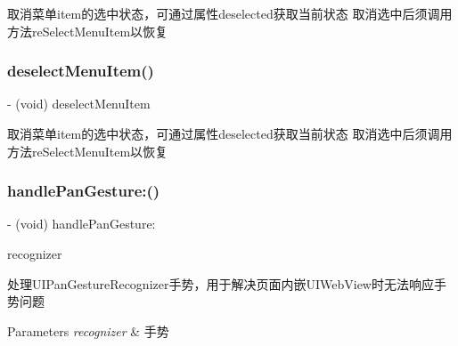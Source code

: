 取消菜单item的选中状态，可通过属性deselected获取当前状态 取消选中后须调用方法re\+Select\+Menu\+Item以恢复 \mbox{\label{interface_v_t_magic_view_a0e92cac6b3957cfc432779b9e9fd953f}} 
\subsubsection{\texorpdfstring{deselect\+Menu\+Item()}{deselectMenuItem()}\hspace{0.1cm}{\footnotesize\ttfamily [3/3]}}
{\footnotesize\ttfamily -\/ (void) deselect\+Menu\+Item \begin{DoxyParamCaption}{ }\end{DoxyParamCaption}}

取消菜单item的选中状态，可通过属性deselected获取当前状态 取消选中后须调用方法re\+Select\+Menu\+Item以恢复 \mbox{\label{interface_v_t_magic_view_a3c17ac83f0b9c1bf684852d60d3f4766}} 
\subsubsection{\texorpdfstring{handle\+Pan\+Gesture\+:()}{handlePanGesture:()}\hspace{0.1cm}{\footnotesize\ttfamily [1/3]}}
{\footnotesize\ttfamily -\/ (void) handle\+Pan\+Gesture\+: \begin{DoxyParamCaption}\item[{(U\+I\+Pan\+Gesture\+Recognizer $\ast$)}]{recognizer }\end{DoxyParamCaption}}

处理\+U\+I\+Pan\+Gesture\+Recognizer手势，用于解决页面内嵌\+U\+I\+Web\+View时无法响应手势问题


\begin{DoxyParams}{Parameters}
{\em recognizer} & 手势 \\
\hline
\end{DoxyParams}
\mbox{\label{interface_v_t_magic_view_a3c17ac83f0b9c1bf684852d60d3f4766}} 
